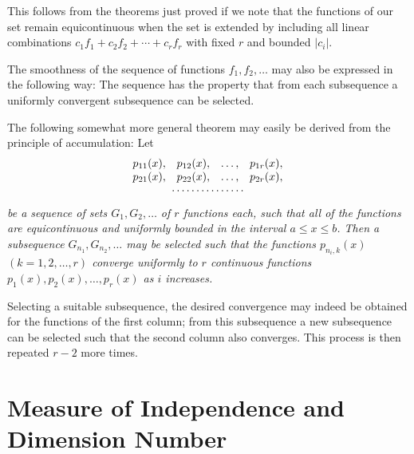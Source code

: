 This follows from the theorems just proved if we note that the functions of our set remain equicontinuous when the set is extended by including all linear combinations $c_1f_1+c_2f_2+\cdots+c_rf_r$ with fixed $r$ and bounded $|c_i|$.

The smoothness of the sequence of functions $f_1,f_2,\ldots$ may also be expressed in the following way: The sequence has the property that from each subsequence a uniformly convergent subsequence can be selected.

The following somewhat more general theorem may easily be derived from the principle of accumulation: Let
\[
\begin{array}{cccc}
p_{11}(x),&p_{12}(x),&\ldots,&p_{1r}(x),\\
p_{21}(x),&p_{22}(x),&\ldots,&p_{2r}(x),\\
\multicolumn{4}{c}{\cdots\cdots\cdots\cdots\cdots}
\end{array}
\]
\emph{be a sequence of sets $G_1,G_2,\ldots$ of $r$ functions each, such that all of the functions are equicontinuous and uniformly bounded in the interval $a\le x\le b$. Then a subsequence $G_{n_1},G_{n_2},\ldots$ may be selected such that the functions $p_{n_i,k}(x)$ $(k=1,2,\ldots,r)$ converge uniformly to $r$ continuous functions $p_1(x),p_2(x),\ldots,p_r(x)$ as $i$ increases.}

Selecting a suitable subsequence, the desired convergence may indeed be obtained for the functions of the first column; from this subsequence a new subsequence can be selected such that the second column also converges. This process is then repeated $r-2$ more times.

\section{Measure of Independence and Dimension Number}
